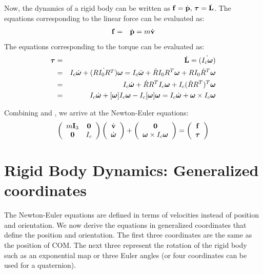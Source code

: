 Now, the dynamics of a rigid body can be written as $\mathbf{f} = \dot{\mathbf{p}} \mbox{,\ } \bm{\tau} = \dot{\mathbf{L}}$. The equations corresponding to the linear force can be evaluated as:
\begin{eqnarray}
\label{eq:force}
\mathbf{f} & = & \dot{\mathbf{p}} = m \dot{\mathbf{v}}
\end{eqnarray}
The equations corresponding to the torque can be evaluated as:
\begin{eqnarray}
\label{eq:torque}
\nonumber
\bm{\tau} & = & \dot{\mathbf{L}} = \dot{(I_c \bm{\omega})} \\
\nonumber
& = & I_c\dot{\bm{\omega}} + \dot{(RI_0 R^T)}\bm{\omega} = I_c\dot{\bm{\omega}} + \dot{R}I_0 R^T\bm{\omega} + R I_0 \dot{R}^T\bm{\omega}\\
\nonumber
& = & I_c\dot{\bm{\omega}} + \dot{R}R^T I_c \bm{\omega} + I_c (\dot{R}R^T)^T\bm{\omega} \\
& = & I_c\dot{\bm{\omega}} + [\bm{\omega}]I_c \bm{\omega} - I_c[\bm{\omega}]\bm{\omega} = I_c\dot{\bm{\omega}} + \bm{\omega} \times I_c \bm{\omega}
\end{eqnarray}

Combining  and , we arrive at the
Newton-Euler equations:
\begin{equation}
\label{eq:newtoneuler}
\left(
\begin{array}{cc}
m\mathbf{I}_3 & \mathbf{0} \\
\mathbf{0} & I_c 
\end{array}
\right)
\left(
\begin{array}{c}
\dot{\mathbf{v}} \\
\dot{\bm{\omega}} 
\end{array}
\right) +
\left(
\begin{array}{c}
\mathbf{0}  \\
\bm{\omega} \times I_c \bm{\omega} 
\end{array}
\right) = 
\left(
\begin{array}{c}
\mathbf{f} \\
\bm{\tau} 
\end{array}
\right)
\end{equation}

\newpage
\section{Rigid Body Dynamics: Generalized coordinates}
\label{sec:rigidbodydyngen}
The Newton-Euler equations are defined in terms of velocities instead of position and orientation. We now derive the equations in generalized coordinates  that define the position and orientation. The first three coordinates are the same as the position of COM. The next three represent the rotation of the rigid body such as an exponential map or three Euler angles (or four coordinates can be used for a quaternion).

